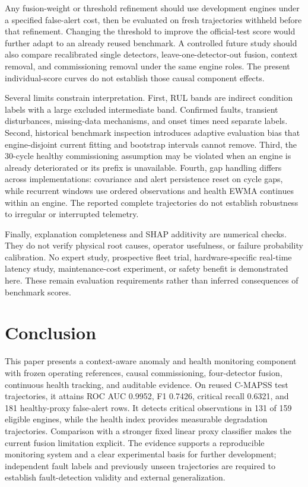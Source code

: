 \documentclass[conference]{IEEEtran}
\begin{document}
Any fusion-weight or threshold refinement should use development engines under a specified false-alert cost, then be evaluated on fresh trajectories withheld before that refinement. Changing the threshold to improve the official-test score would further adapt to an already reused benchmark. A controlled future study should also compare recalibrated single detectors, leave-one-detector-out fusion, context removal, and commissioning removal under the same engine roles. The present individual-score curves do not establish those causal component effects.

Several limits constrain interpretation. First, RUL bands are indirect condition labels with a large excluded intermediate band. Confirmed faults, transient disturbances, missing-data mechanisms, and onset times need separate labels. Second, historical benchmark inspection introduces adaptive evaluation bias that engine-disjoint current fitting and bootstrap intervals cannot remove. Third, the 30-cycle healthy commissioning assumption may be violated when an engine is already deteriorated or its prefix is unavailable. Fourth, gap handling differs across implementations: covariance and alert persistence reset on cycle gaps, while recurrent windows use ordered observations and health EWMA continues within an engine. The reported complete trajectories do not establish robustness to irregular or interrupted telemetry.

Finally, explanation completeness and SHAP additivity are numerical checks. They do not verify physical root causes, operator usefulness, or failure probability calibration. No expert study, prospective fleet trial, hardware-specific real-time latency study, maintenance-cost experiment, or safety benefit is demonstrated here. These remain evaluation requirements rather than inferred consequences of benchmark scores.

\section{Conclusion}
This paper presents a context-aware anomaly and health monitoring component with frozen operating references, causal commissioning, four-detector fusion, continuous health tracking, and auditable evidence. On reused C-MAPSS test trajectories, it attains ROC AUC 0.9952, F1 0.7426, critical recall 0.6321, and 181 healthy-proxy false-alert rows. It detects critical observations in 131 of 159 eligible engines, while the health index provides measurable degradation trajectories. Comparison with a stronger fixed linear proxy classifier makes the current fusion limitation explicit. The evidence supports a reproducible monitoring system and a clear experimental basis for further development; independent fault labels and previously unseen trajectories are required to establish fault-detection validity and external generalization.

\balance


\end{document}
